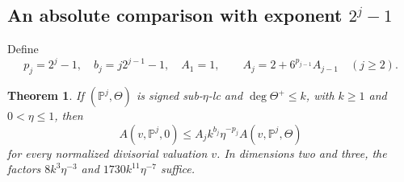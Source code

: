 \documentclass[11pt,reqno]{amsart}
\numberwithin{equation}{section}
\newtheorem{theorem}{Theorem}[section]
\theoremstyle{definition}
\theoremstyle{remark}
\newcommand{\PP}{\mathbb P}
\begin{document}
\subsection{An absolute comparison with exponent $2^j-1$}
Define
\begin{equation}\label{eq:absolconstants}
 p_j=2^j-1,\quad b_j=j2^{j-1}-1,\quad
 A_1=1,\qquad A_j=2+6^{p_{j-1}}A_{j-1}\quad(j\ge2).
\end{equation}
\begin{theorem}\label{thm:absolute}
If $(\PP^j,\Theta)$ is signed sub-$\eta$-lc and $\deg\Theta^+\le k$, with $k\ge1$ and $0<\eta\le1$, then
\begin{equation}\label{eq:absolute}
 A(v,\PP^j,0)\le A_j k^{b_j}\eta^{-p_j}
 A(v,\PP^j,\Theta)
\end{equation}
for every normalized divisorial valuation $v$. In dimensions two and three, the factors $8k^3\eta^{-3}$ and $1730k^{11}\eta^{-7}$ suffice.
\end{theorem}
\end{document}
